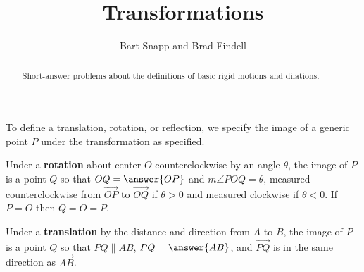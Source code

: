 \documentclass[nooutcomes]{ximera}
\title{Transformations}
\author{Bart Snapp and Brad Findell}
\begin{document}
\begin{abstract}
Short-answer problems about the definitions of basic rigid motions and dilations.
\end{abstract}
\maketitle




To define a translation, rotation, or reflection, we specify the image of a generic point $P$ under the transformation as specified.  

\begin{question}
Under a \textbf{rotation} about center $O$ counterclockwise by an angle $\theta$, the image of $P$ is 
a point $Q$ so that $OQ = \answer{OP}$ and $m\angle POQ = \theta$, measured counterclockwise 
from $\overrightarrow{OP}$ to $\overrightarrow{OQ}$ if $\theta>0$ and measured clockwise if $\theta<0$.  If $P = O$ then $Q=O=P$.  
\end{question}

\begin{question}
Under a \textbf{translation} by the distance and direction from $A$ to $B$, the image of $P$ is a point $Q$ so that $\overline{PQ} \parallel \overline{AB}$, $PQ=\answer{AB}$, and $\overrightarrow{PQ}$ is in the same direction as $\overrightarrow{AB}$.  
\end{question}
\end{document}
